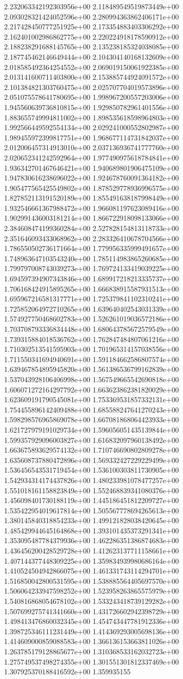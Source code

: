 2.232063342192303956e+00	2.118489549519873449e+00	2.093028321424052596e+00	2.280994363862406171e+00	2.217428450777251925e+00	2.173354883403306292e+00	2.162401002986862775e+00	2.220224918178590912e+00	2.188238291688145765e+00	2.135238185324038085e+00	2.187745462146649444e+00	2.104304140168132609e+00	2.018585492364254552e+00	2.069019150061922385e+00	2.013141600711403800e+00	2.153885744924091572e+00	2.101384821303760475e+00	2.025707704019573896e+00	2.051075578641780695e+00	1.998967200557203006e+00	1.945560639736810815e+00	1.929850782961401556e+00	1.883655749994811002e+00	1.898535618598964803e+00	1.992566449592554134e+00	2.029241000552802987e+00	1.989455972399817751e+00	1.968677114731842037e+00	2.012006457314913010e+00	2.037136936741777760e+00	2.020652341242592964e+00	1.977490975618784841e+00	1.936342701467646421e+00	1.940689801906475109e+00	1.947830616238696022e+00	1.924678760091364182e+00	1.905477565425549802e+00	1.878529778936996575e+00	1.827852113191520189e+00	1.855491638187998449e+00	1.932546661367988472e+00	1.966081197623089416e+00	1.902991436003181214e+00	1.866722918098133066e+00	2.384608474199360284e+00	2.527828154813118733e+00	2.351646093433068962e+00	2.283326410678704566e+00	1.786550502736171664e+00	1.779956335999491657e+00	1.748963647103543240e+00	1.785114983865260685e+00	1.799797008743039273e+00	1.769724133419039225e+00	1.694597394907343846e+00	1.689917218213335737e+00	1.706168424915895265e+00	1.666838915587931513e+00	1.695967216581317771e+00	1.725379841102310241e+00	1.725852064972710265e+00	1.639640402543031339e+00	1.574927750468602783e+00	1.526261019036572186e+00	1.703708793336834448e+00	1.680643785672579549e+00	1.739315884018536762e+00	1.762847484807061216e+00	1.710302513541595903e+00	1.701965314157038556e+00	1.711550341694940691e+00	1.591184662586807574e+00	1.639467854895945820e+00	1.561386536799162839e+00	1.537043928106406998e+00	1.567549665542690818e+00	1.606071272164297792e+00	1.663623862381820029e+00	1.623609191790545081e+00	1.753369531857332131e+00	1.754455896142409488e+00	1.685588247641270243e+00	1.598298576965869078e+00	1.667081868064423933e+00	1.621727979191029734e+00	1.596056051435139844e+00	1.599357929096003827e+00	1.616832097960138492e+00	1.663675893629574132e+00	1.710746690802809278e+00	1.635608737880472896e+00	1.569332427229229499e+00	1.536456543531719454e+00	1.536100303811730905e+00	1.542934314174437826e+00	1.480233981078477257e+00	1.551018161158823849e+00	1.552468839341080376e+00	1.456098401730188119e+00	1.445186451812209727e+00	1.535422954019617814e+00	1.505567778694265613e+00	1.380145840318854233e+00	1.499121828038420645e+00	1.485429944645164868e+00	1.393101435373291341e+00	1.353095487784379936e+00	1.462286351386874683e+00	1.436456200428529728e+00	1.412623137711158661e+00	1.407144377448309225e+00	1.359834939980686164e+00	1.410524504942866075e+00	1.461331743114294701e+00	1.516850042800531595e+00	1.538885564405697570e+00	1.506064233947598252e+00	1.523958263865575979e+00	1.540816868054678102e+00	1.533243418739129282e+00	1.507699275741341660e+00	1.431726602942398729e+00	1.498413476860032345e+00	1.454743447781912336e+00	1.398725346111231449e+00	1.414369293005698136e+00	1.414609000859088583e+00	1.366136153663811026e+00	1.263785179128865677e+00	1.310368533162032723e+00	1.275749537498274355e+00	1.301551301812337469e+00	1.307925370188416592e+00	1.359935155